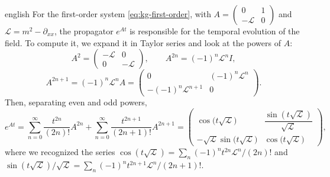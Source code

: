 \documentclass[0000.tex]{subfiles}
\begin{document}
\begin{hyphenrules}{english}
For the first-order system \eqref{eq:kg-first-order}, with $A=\begin{pmatrix}0&1\\-\mathcal{L}&0\end{pmatrix}$
and $\mathcal{L}=m^2-\partial_{xx}$, the propagator $e^{At}$ is responsible for the temporal evolution of
the field. To compute it, we expand it in Taylor series and look at the powers of $A$:
\[
  A^2=\begin{pmatrix}-\mathcal{L} & 0\\ 0 & -\mathcal{L}\end{pmatrix},\qquad
  A^{2n}=(-1)^n\mathcal{L}^{n}I,
\]
\[
  A^{2n+1}=(-1)^n\mathcal{L}^{n}A=\begin{pmatrix}0 & (-1)^n\mathcal{L}^{n}\\ -(-1)^n\mathcal{L}^{n+1} & 0\end{pmatrix}.
\]
Then, separating even and odd powers,
\begin{equation}
  e^{At}=\sum_{n=0}^{\infty}\frac{t^{2n}}{(2n)!}A^{2n}+\sum_{n=0}^{\infty}\frac{t^{2n+1}}{(2n+1)!}A^{2n+1}
  =\begin{pmatrix}
    \cos\big(t\sqrt{\mathcal{L}}\big) & \dfrac{\sin(t\sqrt{\mathcal{L}})}{\sqrt{\mathcal{L}}}\\[2mm]
    -\sqrt{\mathcal{L}}\sin\big(t\sqrt{\mathcal{L}}\big) & \cos\big(t\sqrt{\mathcal{L}}\big)
  \end{pmatrix},
  \label{eq:app-kg-propagator}
\end{equation}
where we recognized the series
$\cos(t\sqrt{\mathcal{L}})=\sum_n(-1)^nt^{2n}\mathcal{L}^n/(2n)!$ and
$\sin(t\sqrt{\mathcal{L}})/\sqrt{\mathcal{L}}=\sum_n(-1)^nt^{2n+1}\mathcal{L}^n/(2n+1)!$.

\end{hyphenrules}

\ifSubfilesClassLoaded{}{}
\end{document}
